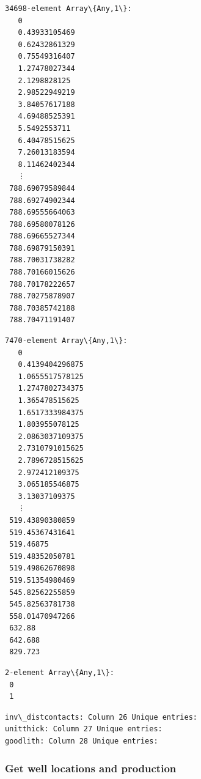\documentclass[11pt]{article}
\begin{document}
    
    \begin{Verbatim}[commandchars=\\\{\}]
34698-element Array\{Any,1\}:
   0
   0.43933105469
   0.62432861329
   0.75549316407
   1.27478027344
   2.1298828125
   2.98522949219
   3.84057617188
   4.69488525391
   5.5492553711
   6.40478515625
   7.26013183594
   8.11462402344
   ⋮
 788.69079589844
 788.69274902344
 788.69555664063
 788.69580078126
 788.69665527344
 788.69879150391
 788.70031738282
 788.70166015626
 788.70178222657
 788.70275878907
 788.70385742188
 788.70471191407
    \end{Verbatim}

    
    
    \begin{Verbatim}[commandchars=\\\{\}]
7470-element Array\{Any,1\}:
   0
   0.4139404296875
   1.0655517578125
   1.2747802734375
   1.365478515625
   1.6517333984375
   1.803955078125
   2.0863037109375
   2.7310791015625
   2.7896728515625
   2.972412109375
   3.065185546875
   3.13037109375
   ⋮
 519.43890380859
 519.45367431641
 519.46875
 519.48352050781
 519.49862670898
 519.51354980469
 545.82562255859
 545.82563781738
 558.01470947266
 632.88
 642.688
 829.723
    \end{Verbatim}

    
    
    \begin{Verbatim}[commandchars=\\\{\}]
2-element Array\{Any,1\}:
 0
 1
    \end{Verbatim}

    
    \begin{Verbatim}[commandchars=\\\{\}]
inv\_distcontacts: Column 26 Unique entries:
unitthick: Column 27 Unique entries:
goodlith: Column 28 Unique entries:
    \end{Verbatim}

    \hypertarget{get-well-locations-and-production}{%
\subsubsection{Get well locations and
production}\label{get-well-locations-and-production}}
\end{document}

